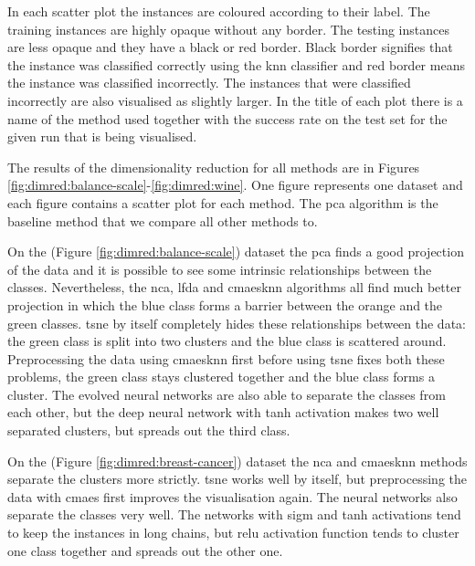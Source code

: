 \documentclass[12pt,a4paper]{report}
\begin{document}
In each scatter plot the instances are coloured according to their label. The training instances are highly opaque without any border. The testing instances are less opaque and they have a black or red border. Black border signifies that the instance was classified correctly using the \ac{knn} classifier and red border means the instance was classified incorrectly. The instances that were classified incorrectly are also visualised as slightly larger. In the title of each plot there is a name of the method used together with the success rate on the test set for the given run that is being visualised.

The results of the dimensionality reduction for all methods are in Figures \ref{fig:dimred:balance-scale}-\ref{fig:dimred:wine}. One figure represents one dataset and each figure contains a scatter plot for each method. The \ac{pca} algorithm is the baseline method that we compare all other methods to. 

On the  (Figure \ref{fig:dimred:balance-scale}) dataset the \ac{pca} finds a good projection of the data and it is possible to see some intrinsic relationships between the classes. Nevertheless, the \ac{nca}, \ac{lfda} and \ac{cmaesknn} algorithms all find much better projection in which the blue class forms a barrier between the orange and the green classes. \ac{tsne} by itself completely hides these relationships between the data: the green class is split into two clusters and the blue class is scattered around. Preprocessing the data using \ac{cmaesknn} first before using \ac{tsne} fixes both these problems, the green class stays clustered together and the blue class forms a cluster. The evolved neural networks are also able to separate the classes from each other, but the deep neural network with \ac{tanh} activation makes two well separated clusters, but spreads out the third class.

On the  (Figure \ref{fig:dimred:breast-cancer}) dataset the \ac{nca} and \ac{cmaesknn} methods separate the clusters more strictly. \ac{tsne} works well by itself, but preprocessing the data with \ac{cmaes} first improves the visualisation again. The neural networks also separate the classes very well. The networks with \ac{sigm} and \ac{tanh} activations tend to keep the instances in long chains, but \ac{relu} activation function tends to cluster one class together and spreads out the other one.
\end{document}
